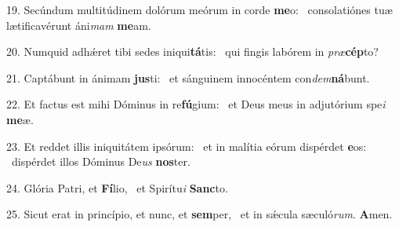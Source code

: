 19. Secúndum multitúdinem dolórum meórum in corde \textbf{me}o: \ast\  consolatiónes tuæ lætificavérunt áni\textit{mam} \textbf{me}am.\

20. Numquid adhǽret tibi sedes iniqui\textbf{tá}tis: \ast\  qui fingis labórem in \textit{præ}\textbf{cép}to?\

21. Captábunt in ánimam \textbf{jus}ti: \ast\  et sánguinem innocéntem con\textit{dem}\textbf{ná}bunt.\

22. Et factus est mihi Dóminus in re\textbf{fú}gium: \ast\  et Deus meus in adjutórium spe\textit{i} \textbf{me}æ.\

23. Et reddet illis iniquitátem ipsórum: \dag\  et in malítia eórum dispérdet \textbf{e}os: \ast\  dispérdet illos Dóminus De\textit{us} \textbf{nos}ter.\

24. Glória Patri, et \textbf{Fí}lio, \ast\  et Spirítu\textit{i} \textbf{Sanc}to.\

25. Sicut erat in princípio, et nunc, et \textbf{sem}per, \ast\  et in sǽcula sæculó\textit{rum}. \textbf{A}men.\

